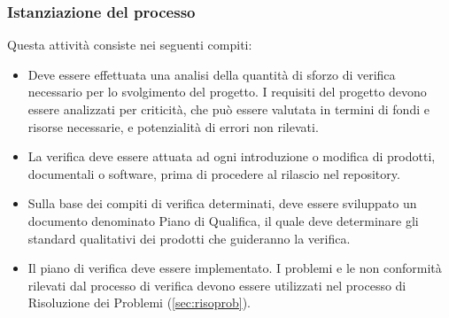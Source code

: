 \subsubsection{Istanziazione del processo}
Questa attività consiste nei seguenti compiti:
\begin{itemize}
    \item Deve essere effettuata una analisi della quantità di sforzo di verifica necessario per lo svolgimento del progetto. I requisiti del progetto devono essere analizzati per criticità, che può essere valutata in termini di fondi e risorse necessarie, e potenzialità di errori non rilevati.
    \item La verifica deve essere attuata ad ogni introduzione o modifica di prodotti, documentali o software, prima di procedere al rilascio nel repository. 
    \item Sulla base dei compiti di verifica determinati, deve essere sviluppato un documento denominato Piano di Qualifica, il quale deve determinare gli standard qualitativi dei prodotti che guideranno la verifica.
    \item Il piano di verifica deve essere implementato. I problemi e le non conformità rilevati dal processo di verifica devono essere utilizzati nel processo di Risoluzione dei Problemi (\ref{sec:risoprob}).
\end{itemize}


